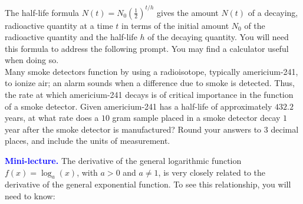 \documentclass[10pt]{article}
\begin{document}
\newpage%

 The half-life formula $\displaystyle N(t) = N_0\left(\frac12\right)^{t/h}$ gives the amount $N(t)$ of a decaying, radioactive quantity at a time $t$ in terms of the initial amount $N_0$ of the radioactive quantity and the half-life $h$ of the decaying quantity. You will need this formula to address the following prompt. You may find a calculator useful when doing so.\\

Many smoke detectors function by using a radioisotope, typically americium-241, to ionize air; an alarm sounds when a difference due to smoke is detected. Thus, the rate at which americium-241 decays is of critical importance in the function of a smoke detector. Given americium-241 has a half-life of approximately $432.2$ years, at what rate does a $10$ gram sample placed in a smoke detector decay $1$ year after the smoke detector is manufactured? Round your answers to 3 decimal places, and include the units of measurement.




\reversemarginpar{} {\bf \textcolor{blue}{Mini-lecture.}} \mod The derivative of the general logarithmic function $f(x)=\log_a(x)$, with $a>0$ and $a\neq1$, is very closely related to the derivative of the general exponential function. To see this relationship, you will need to know:\\
\end{document}
